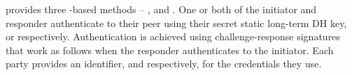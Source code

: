 %    
\mEdhoc{} provides three \mStat-based methods -- \mSigStat{}, \mStatStat{} and
\mStatSig{}.
%
One or both of the initiator and responder authenticate to their peer using
their secret static long-term DH key, \mLtki{} or \mLtkr{} respectively.
%
Authentication is achieved using challenge-response signatures that work as
follows when the responder authenticates to the initiator.
%
Each party provides an identifier, \mIdcredi{} and \mIdcredr{} respectively,
for the credentials they use.
%

